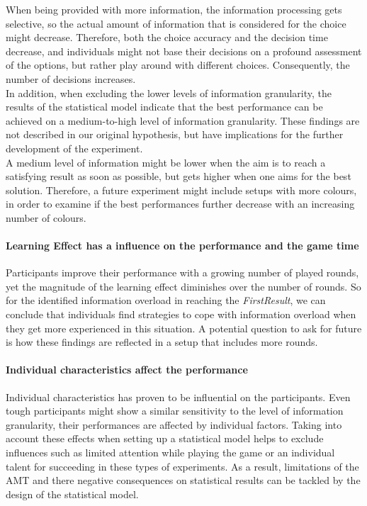 When being provided with more information, the information processing gets selective, so the actual amount of information that is considered for the choice might decrease. Therefore, both the choice accuracy and the decision time decrease, and individuals might not base their decisions on a profound assessment of the options, but rather play around with different choices. Consequently, the number of decisions increases.\\
In addition, when excluding the lower levels of information granularity, the results of the statistical model indicate that the best performance can be achieved on a medium-to-high level of information granularity. These findings are not described in our original hypothesis, but have implications for the further development of the experiment.\\
A medium level of information might be lower when the aim is to reach a satisfying result as soon as possible, but gets higher when one aims for the best solution. Therefore, a future experiment might include setups with more colours, in order to examine if the best performances further decrease with an increasing number of colours. 

\paragraph{Learning Effect has a influence on the performance and the game time} 

Participants improve their performance with a growing number of played rounds, yet the magnitude of the learning effect diminishes over the number of rounds. So for the identified information overload in reaching the \textit{FirstResult}, we can conclude that individuals find strategies to cope with information overload when they get more experienced in this situation. A potential question to ask for future is how these findings are reflected in a setup that includes more rounds.

\paragraph{Individual characteristics affect the performance}
Individual characteristics has proven to be influential on the participants. Even tough participants might show a similar sensitivity to the level of information granularity, their performances are affected by individual factors. Taking into account these effects when setting up a statistical model helps to exclude influences such as limited attention while playing the game or an individual talent for succeeding in these types of experiments. As a result, limitations of the \acl{AMT} and there negative consequences on statistical results can be tackled by the design of the statistical model.

